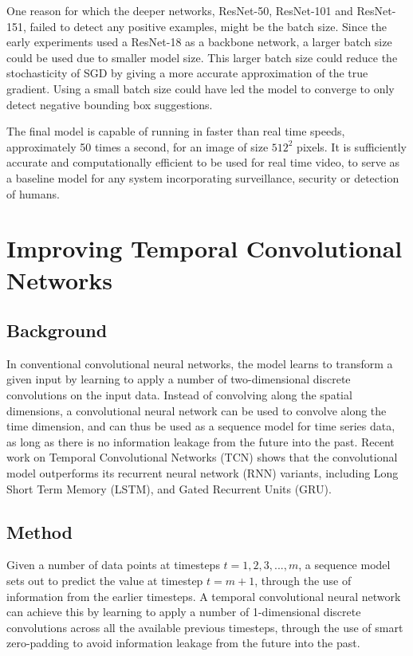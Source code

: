 \documentclass[a4paper, twoside]{article}
\begin{document}
One reason for which the deeper networks, ResNet-50, ResNet-101 and ResNet-151, failed to detect any positive examples, might be the batch size. Since the early experiments used a ResNet-18 as a backbone network, a larger batch size could be used due to smaller model size. This larger batch size could reduce the stochasticity of SGD by giving a more accurate approximation of the true gradient. Using a small batch size could have led the model to converge to only detect negative bounding box suggestions.

The final model is capable of running in faster than real time speeds, approximately 50 times a second, for an image of size $512^2$ pixels. It is sufficiently accurate and computationally efficient to be used for real time video, to serve as a baseline model for any system incorporating surveillance, security or detection of humans.

\section{Improving Temporal Convolutional Networks}
\subsection{Background}
In conventional convolutional neural networks, the model learns to transform a given input by learning to apply a number of two-dimensional discrete convolutions on the input data. Instead of convolving along the spatial dimensions, a convolutional neural network can be used to convolve along the time dimension, and can thus be used as a sequence model for time series data, as long as there is no information leakage from the future into the past. Recent work on Temporal Convolutional Networks (TCN) \cite{tcn} shows that the convolutional model outperforms its recurrent neural network (RNN) variants, including Long Short Term Memory (LSTM), and Gated Recurrent Units (GRU). 

\subsection{Method}
Given a number of data points at timesteps $t = 1, 2, 3, ..., m$, a sequence model sets out to predict the value at timestep $t = m+1$, through the use of information from the earlier timesteps. A temporal convolutional neural network can achieve this by learning to apply a number of 1-dimensional discrete convolutions across all the available previous timesteps, through the use of smart zero-padding to avoid information leakage from the future into the past.
\end{document}
